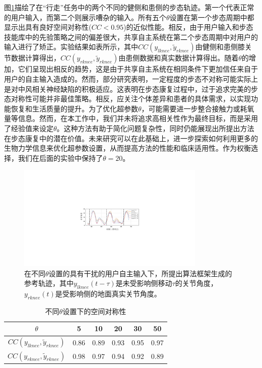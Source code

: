 图\ref{fig:5-5}描绘了在``行走''任务中的两个不同的健侧和患侧的步态轨迹。第一个代表正常的用户输入，而第二个则展示嘈杂的输入。所有五个$\theta$设置在第一个步态周期中都显示出具有良好空间对称性($CC<0.95$)的近似性能。相反，由于用户输入和步态技能库中的先验策略之间的偏差很大，共享自主系统在第二个步态周期中对用户的输入进行了矫正。实验结果如表\uppercase \expandafter{}所示，其中${CC}({y_{lknee}},{\tilde y_{rknee}})$由健侧和患侧膝关节数据计算得出，${CC}({y_{rknee}},{\tilde y_{rknee}})$由患侧数据和真实数据计算得出。随着$\theta $的增加，它们呈现出相反的趋势，这是由于共享自主系统在相同条件下更加信任来自于用户的自主输入造成的。然而，部分研究表明，一定程度的步态不对称可能实际上是对中风相关神经缺陷的积极适应。这表明在步态康复过程中，过于追求完美的步态对称性可能并非最佳策略。相反，应关注个体差异和患者的具体需求，以实现功能恢复和生活质量的提升\cite{balabanGaitDisturbancesPatients2014}。为了优化超参数$\theta $，可能需要进一步整合接触力或耗氧量等信息。然而，在本工作中，我们并未将追求高相关性作为最终目标，而是采用了经验值来设定$\theta $。这种方法有助于简化问题复杂性，同时仍能展现出所提出方法在步态康复中的潜在价值。未来研究可以在此基础上，进一步探索如何利用更多的生物力学信息来优化超参数设置，从而提高方法的性能和临床适用性。作为权衡选择，我们在后面的实验中保持了$\theta =20$。
\begin{figure}[htb]
  \centering\includegraphics[width=0.8\textwidth]{figures/5-Fig-5.pdf}
  \caption{在不同$\theta $设置的具有干扰的用户自主输入下，所提出算法框架生成的参考轨迹，其中${y_{lknee}}(t - \tau )$是未受影响侧移动$\tau $的关节角度，${y_{rknee}}(t)$是受影响侧的地面真实关节角度。}
  \label{fig:5-5}
\end{figure}

\begin{table}[htb]
  \centering
  \caption{不同$\theta $设置下的空间对称性}
  \begin{tabular}{cccccc}
  \toprule
          $\theta $         & 5 & 10 & 20 & 30 & 50  \\ 
  \midrule
          ${CC}({y_{lknee}},{\tilde y_{rknee}})$         & 0.86	&0.89	&0.93	&0.95	&0.97  \\ 
          ${CC}({y_{rknee}},{\tilde y_{rknee}})$         & 0.98 &0.97	&0.94	&0.92	&0.89  \\ 
  \bottomrule
  \end{tabular}
  \label{tab:5-1} 
\end{table}   

